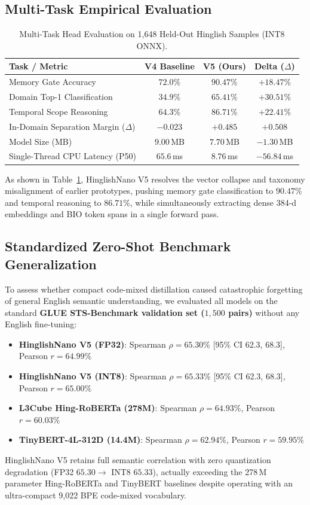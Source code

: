\documentclass[11pt,a4paper]{article}
\begin{document}
\subsection{Multi-Task Empirical Evaluation}

\begin{table}[htbp]
\centering
\small
\caption{Multi-Task Head Evaluation on 1,648 Held-Out Hinglish Samples (INT8 ONNX).}
\label{tab:multitask_eval}
\begin{tabular}{lccc}
\toprule
\textbf{Task / Metric} & \textbf{V4 Baseline} & \textbf{V5 (Ours)} & \textbf{Delta ($\Delta$)} \\
\midrule
Memory Gate Accuracy & $72.0\%$ & $\mathbf{90.47\%}$ & $+18.47\%$ \\
Domain Top-1 Classification & $34.9\%$ & $\mathbf{65.41\%}$ & $+30.51\%$ \\
Temporal Scope Reasoning & $64.3\%$ & $\mathbf{86.71\%}$ & $+22.41\%$ \\
In-Domain Separation Margin ($\Delta$) & $-0.023$ & $\mathbf{+0.485}$ & $+0.508$ \\
Model Size (MB) & $9.00$\,MB & $\mathbf{7.70}$\,MB & $-1.30$\,MB \\
Single-Thread CPU Latency (P50) & $65.6$\,ms & $\mathbf{8.76}$\,ms & $-56.84$\,ms \\
\bottomrule
\end{tabular}
\end{table}

As shown in Table~\ref{tab:multitask_eval}, HinglishNano V5 resolves the vector collapse and taxonomy misalignment of earlier prototypes, pushing memory gate classification to \textbf{$90.47\%$} and temporal reasoning to \textbf{$86.71\%$}, while simultaneously extracting dense 384-d embeddings and BIO token spans in a single forward pass.

\subsection{Standardized Zero-Shot Benchmark Generalization}
To assess whether compact code-mixed distillation caused catastrophic forgetting of general English semantic understanding, we evaluated all models on the standard \textbf{GLUE STS-Benchmark validation set ($1,500$ pairs)} without any English fine-tuning:
\begin{itemize}
    \item \textbf{HinglishNano V5 (FP32)}: Spearman $\rho = \mathbf{65.30\%}$ [95\% CI 62.3, 68.3], Pearson $r = 64.99\%$
    \item \textbf{HinglishNano V5 (INT8)}: Spearman $\rho = \mathbf{65.33\%}$ [95\% CI 62.3, 68.3], Pearson $r = 65.00\%$
    \item \textbf{L3Cube Hing-RoBERTa (278M)}: Spearman $\rho = 64.93\%$, Pearson $r = 60.03\%$
    \item \textbf{TinyBERT-4L-312D (14.4M)}: Spearman $\rho = 62.94\%$, Pearson $r = 59.95\%$
\end{itemize}
HinglishNano V5 retains full semantic correlation with zero quantization degradation (FP32 $65.30 \to$ INT8 $65.33$), actually exceeding the 278\,M parameter Hing-RoBERTa and TinyBERT baselines despite operating with an ultra-compact 9,022 BPE code-mixed vocabulary.
\end{document}
